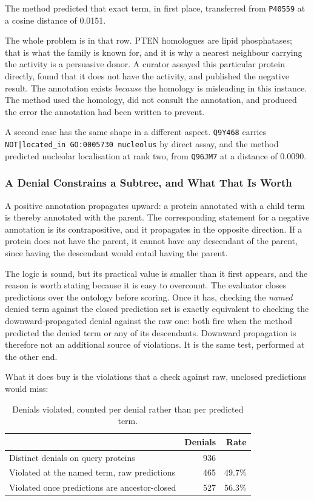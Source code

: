 The method predicted that exact term, in first place, transferred from \texttt{P40559}
at a cosine distance of 0.0151.

The whole problem is in that row. PTEN homologues are lipid phosphatases; that is what
the family is known for, and it is why a nearest neighbour carrying the activity is a
persuasive donor. A curator assayed this particular protein directly, found that it
does not have the activity, and published the negative result. The annotation exists
\emph{because} the homology is misleading in this instance. The method used the
homology, did not consult the annotation, and produced the error the annotation had
been written to prevent.

A second case has the same shape in a different aspect. \texttt{Q9Y468} carries
\texttt{NOT|located\_in GO:0005730 nucleolus} by direct assay, and the method predicted
nucleolar localisation at rank two, from \texttt{Q96JM7} at a distance of 0.0090.

\subsubsection{A Denial Constrains a Subtree, and What That Is Worth}

A positive annotation propagates upward: a protein annotated with a child term is
thereby annotated with the parent. The corresponding statement for a negative
annotation is its contrapositive, and it propagates in the opposite direction. If a
protein does not have the parent, it cannot have any descendant of the parent, since
having the descendant would entail having the parent.

The logic is sound, but its practical value is smaller than it first appears, and the
reason is worth stating because it is easy to overcount. The evaluator closes
predictions over the ontology before scoring. Once it has, checking the \emph{named}
denied term against the closed prediction set is exactly equivalent to checking the
downward-propagated denial against the raw one: both fire when the method predicted the
denied term or any of its descendants. Downward propagation is therefore not an
additional source of violations. It is the same test, performed at the other end.

What it does buy is the violations that a check against raw, unclosed predictions would
miss:

\begin{table}[htbp]
\centering
\caption{Denials violated, counted per denial rather than per predicted term.}
\label{tab:exp16-propagation}
\begin{tabular}{lrr}
\toprule
 & Denials & Rate \\
\midrule
Distinct denials on query proteins & 936 & \\
Violated at the named term, raw predictions & 465 & 49.7\% \\
Violated once predictions are ancestor-closed & 527 & 56.3\% \\
\bottomrule
\end{tabular}
\end{table}

